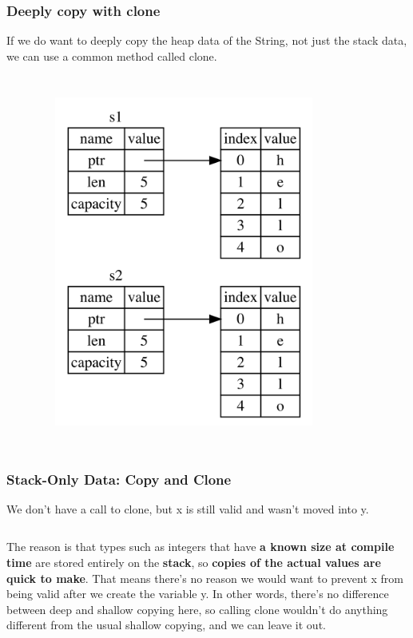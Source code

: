 \documentclass{beamer}
\begin{document}
\begin{frame}[fragile]
	\frametitle{Deeply copy with clone}
	If we do want to deeply copy the heap data of the String, not just the stack data, we can use a common method called clone.
	
		\begin{columns}
			\inputminted{rust}{./code/move-clone.rs}
			\begin{figure}
				\centering
				\includegraphics[width=0.8\textwidth]{./img/trpl04-03.png}
				\label{fig:figureSAnotherPossibility2}
			\end{figure}
	\end{columns}
\end{frame}



\begin{frame}[fragile]
	\frametitle{Stack-Only Data: Copy and Clone}
	We don’t have a call to clone, but x is still valid and wasn’t moved into y.
	\inputminted{rust}{./code/move2.rs}

The reason is that types such as integers that have \textbf{a known size at compile time} are stored entirely on the \textbf{stack}, so \textbf{copies of the actual values are quick to make}. That means there’s no reason we would want to prevent x from being valid after we create the variable y. In other words, there’s no difference between deep and shallow copying here, so calling clone wouldn’t do anything different from the usual shallow copying, and we can leave it out.
\end{frame}
\end{document}
